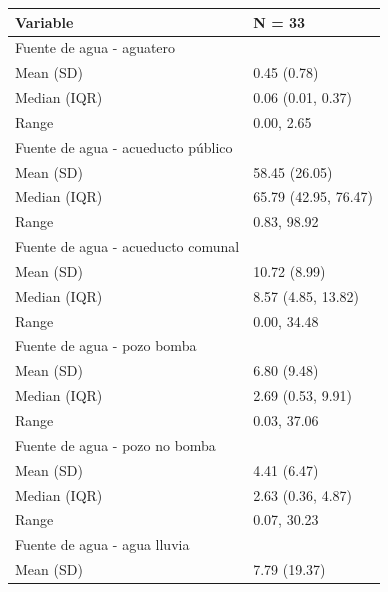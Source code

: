 \begin{table}
\centering\begingroup\fontsize{7}{9}\selectfont

\begin{tabular}{ll}
\toprule
Variable & N = 33\\
\midrule
Fuente de agua - aguatero & \\
\hspace{1em}Mean (SD) & 0.45 (0.78)\\
\hspace{1em}Median (IQR) & 0.06 (0.01, 0.37)\\
\hspace{1em}Range & 0.00, 2.65\\
Fuente de agua - acueducto público & \\
\addlinespace
\hspace{1em}Mean (SD) & 58.45 (26.05)\\
\hspace{1em}Median (IQR) & 65.79 (42.95, 76.47)\\
\hspace{1em}Range & 0.83, 98.92\\
Fuente de agua - acueducto comunal & \\
\hspace{1em}Mean (SD) & 10.72 (8.99)\\
\addlinespace
\hspace{1em}Median (IQR) & 8.57 (4.85, 13.82)\\
\hspace{1em}Range & 0.00, 34.48\\
Fuente de agua - pozo bomba & \\
\hspace{1em}Mean (SD) & 6.80 (9.48)\\
\hspace{1em}Median (IQR) & 2.69 (0.53, 9.91)\\
\addlinespace
\hspace{1em}Range & 0.03, 37.06\\
Fuente de agua - pozo no bomba & \\
\hspace{1em}Mean (SD) & 4.41 (6.47)\\
\hspace{1em}Median (IQR) & 2.63 (0.36, 4.87)\\
\hspace{1em}Range & 0.07, 30.23\\
\addlinespace
Fuente de agua - agua lluvia & \\
\hspace{1em}Mean (SD) & 7.79 (19.37)\\

\end{tabular}
\end{table}
